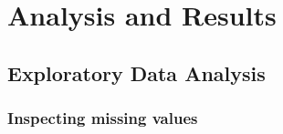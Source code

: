 \documentclass[
  10pt,
]{article}
\begin{document}
\hypertarget{analysis-and-results}{%
\section{Analysis and Results}\label{analysis-and-results}}

\hypertarget{exploratory-data-analysis}{%
\subsection{Exploratory Data Analysis}\label{exploratory-data-analysis}}

\hypertarget{inspecting-missing-values}{%
\subsubsection{Inspecting missing values}\label{inspecting-missing-values}}
\end{document}
